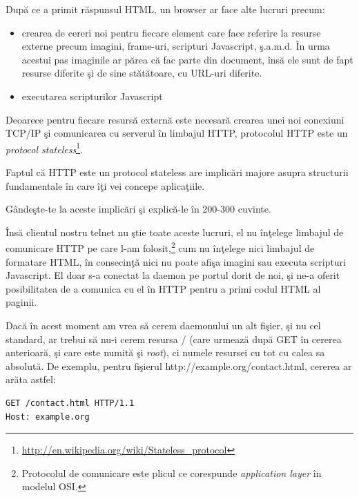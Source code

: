 După ce a primit răspunsul HTML, un browser ar face alte lucruri precum:
\begin{itemize}
\item crearea de cereri noi pentru fiecare element care face referire la resurse
externe precum imagini, frame-uri, scripturi Javascript, ş.a.m.d. În urma 
acestui pas imaginile ar părea că fac parte din document, însă ele sunt de fapt
resurse diferite şi de sine stătătoare, cu URL-uri diferite.
\item executarea scripturilor Javascript
\end{itemize}

Deoarece pentru fiecare resursă externă este necesară crearea unei noi conexiuni
TCP/IP şi comunicarea cu serverul în limbajul HTTP, protocolul HTTP este
un \textsl{protocol stateless}\footnote{\url{http://en.wikipedia.org/wiki/Stateless\_protocol}}.


\begin{Exercise}[title={HTTP e stateless}]
Faptul că HTTP este un protocol stateless are implicări majore asupra
structurii fundamentale în care îţi vei concepe aplicaţiile.

Gândeşte-te la aceste implicări şi explică-le în 200-300 cuvinte.
\end{Exercise}

Însă clientul nostru telnet nu ştie toate aceste lucruri, el nu înţelege
limbajul de comunicare HTTP pe care l-am folosit,\footnote{Protocolul
de comunicare este {\glqq}plicul{\grqq} ce corespunde \textsl{application layer} în modelul OSI.}
cum nu înţelege nici limbajul
de formatare HTML, în consecinţă nici nu poate afişa imagini sau executa scripturi Javascript.
El doar s-a conectat la daemon pe portul dorit de noi, şi ne-a oferit posibilitatea
de a comunica cu el în HTTP pentru a primi codul HTML al paginii.

Dacă în acest moment am vrea să cerem daemonului un alt fişier, şi nu cel standard,
ar trebui să nu-i cerem resursa {\glqq}/{\grqq} (care urmează după {\glqq}GET{\grqq} în cererea anterioară,
şi care este numită şi \textsl{root}),
ci numele resursei cu tot cu calea sa absolută. De exemplu, pentru fişierul
{\glqq}http://example.org/contact.html{\grqq},
cererea ar arăta astfel:

\begin{verbatim}
GET /contact.html HTTP/1.1
Host: example.org

\end{verbatim}

